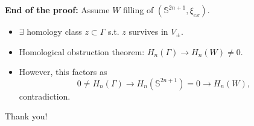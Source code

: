 \documentclass{beamer}
\begin{document}
\begin{frame}

\textbf{End of the proof:} Assume $W$ filling of $(\mathbb S^{2n+1},\xi_{ex})$.

\begin{itemize}
    \item $\exists$ homology class $z\subset \Gamma$ s.t. $z$ survives in $V_\pm$.
    \pause
    \item Homological obstruction theorem: $H_n(\Gamma) \to H_n(W) \neq 0$.
    \pause
    \item  However, this factors as
    $$
    0\neq H_n(\Gamma) \rightarrow H_n(\mathbb S^{2n+1})=0 \rightarrow H_n(W),
    $$
    contradiction.
\end{itemize}
\end{frame}

\begin{frame}
\centering
Thank you!
    
\end{frame}
\end{document}
